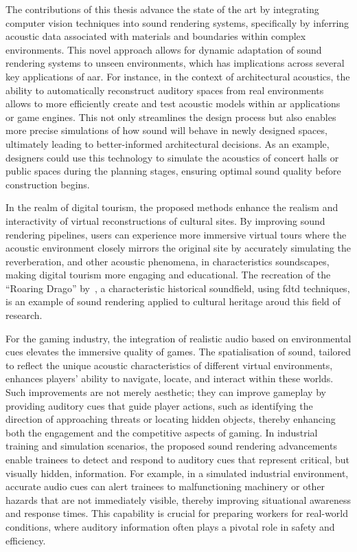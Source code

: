 The contributions of this thesis advance the state of the art by integrating computer vision techniques into sound rendering systems, specifically by inferring acoustic data associated with materials and boundaries within complex environments. This novel approach allows for dynamic adaptation of sound rendering systems to unseen environments, which has implications across several key applications of \acrfull{aar}.
For instance, in the context of architectural acoustics, the ability to automatically reconstruct auditory spaces from real environments allows to more efficiently create and test acoustic models within \acrshort{ar} applications or game engines. This not only streamlines the design process but also enables more precise simulations of how sound will behave in newly designed spaces, ultimately leading to better-informed architectural decisions. As an example, designers could use this technology to simulate the acoustics of concert halls or public spaces during the planning stages, ensuring optimal sound quality before construction begins.\par
In the realm of digital tourism, the proposed methods enhance the realism and interactivity of virtual reconstructions of cultural sites. By improving sound rendering pipelines, users can experience more immersive virtual tours where the acoustic environment closely mirrors the original site by accurately simulating the reverberation, and other acoustic phenomena, in characteristics soundscapes, making digital tourism more engaging and educational. The recreation of the ``Roaring Drago'' by~\cite{yokota2008numerical}, a characteristic historical soundfield, using \acrshort{fdtd} techniques, is an example of sound rendering applied to cultural heritage aroud this field of research.\par
For the gaming industry, the integration of realistic audio based on environmental cues elevates the immersive quality of games. The spatialisation of sound, tailored to reflect the unique acoustic characteristics of different virtual environments, enhances players' ability to navigate, locate, and interact within these worlds. Such improvements are not merely aesthetic; they can improve gameplay by providing auditory cues that guide player actions, such as identifying the direction of approaching threats or locating hidden objects, thereby enhancing both the engagement and the competitive aspects of gaming.
In industrial training and simulation scenarios, the proposed sound rendering advancements enable trainees to detect and respond to auditory cues that represent critical, but visually hidden, information. For example, in a simulated industrial environment, accurate audio cues can alert trainees to malfunctioning machinery or other hazards that are not immediately visible, thereby improving situational awareness and response times. This capability is crucial for preparing workers for real-world conditions, where auditory information often plays a pivotal role in safety and efficiency.
